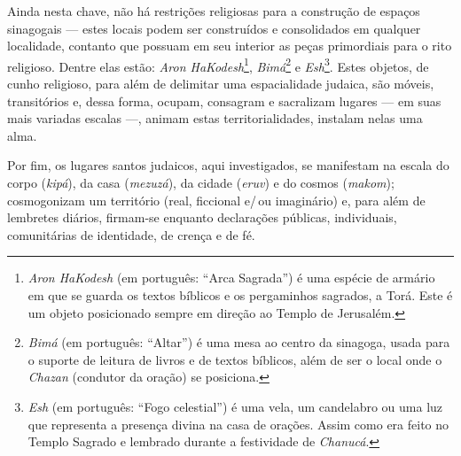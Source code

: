 Ainda nesta chave, não há restrições religiosas para a construção de
espaços sinagogais --- estes locais podem ser construídos e consolidados
em qualquer localidade, contanto que possuam em seu interior as peças
primordiais para o rito religioso. Dentre elas estão: \emph{Aron
HaKodesh}\footnote{\emph{Aron HaKodesh} (em português: ``Arca Sagrada'')
  é uma espécie de armário em que se guarda os textos bíblicos e os
  pergaminhos sagrados, a Torá. Este é um objeto posicionado
  sempre em direção ao Templo de Jerusalém.}, \emph{Bimá}\footnote{\emph{Bimá}
  (em português: ``Altar'') é uma mesa ao centro da sinagoga, usada para
  o suporte de leitura de livros e de textos bíblicos, além de ser o
  local onde o \emph{Chazan} (condutor da oração) se posiciona.} e
\emph{Esh}\footnote{\emph{Esh} (em português: ``Fogo celestial'') é uma
  vela, um candelabro ou uma luz que representa a presença divina na
  casa de orações. Assim como era feito no Templo Sagrado e lembrado durante a
  festividade de \emph{Chanucá}.}. Estes objetos, de cunho religioso,
para além de delimitar uma espacialidade judaica, são móveis,
transitórios e, dessa forma, ocupam, consagram e sacralizam lugares ---
em suas mais variadas escalas ---, animam estas territorialidades,
instalam nelas uma alma.

Por fim, os lugares santos judaicos, aqui investigados, se manifestam na
escala do corpo (\emph{kipá}), da casa (\emph{mezuzá}), da cidade
(\emph{eruv}) e do cosmos (\emph{makom}); cosmogonizam um território
(real, ficcional e/\,ou imaginário) e, para além de lembretes diários,
firmam-se enquanto declarações públicas, individuais, comunitárias de
identidade, de crença e de fé.

\begin{center}\end{center}

